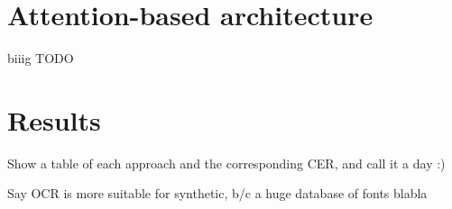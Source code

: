 \section{Attention-based architecture}\label{sec:attention}
	biiig TODO


\section{Results}\label{sec:transcription_results}

		Show a table of each approach and the corresponding CER, and call it a day :)

	Say OCR is more suitable for synthetic, b/c a huge database of fonts blabla

\stopToDo{}

